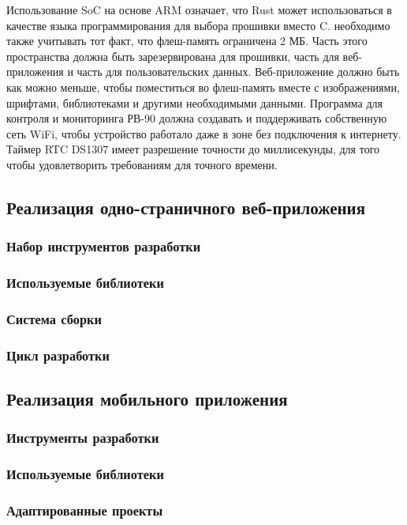 Использование SoC на основе ARM означает, что Rust может использоваться в качестве языка программирования для выбора прошивки вместо C. необходимо также учитывать тот факт, что флеш-память ограничена 2 МБ. Часть этого пространства должна быть зарезервирована для прошивки, часть для веб-приложения и часть для пользовательских данных. Веб-приложение должно быть как можно меньше, чтобы поместиться во флеш-память вместе с изображениями, шрифтами, библиотеками и другими необходимыми данными. Программа для контроля и мониторинга РВ-90 должна создавать и поддерживать собственную сеть WiFi, чтобы устройство работало даже в зоне без подключения к интернету. Таймер RTC DS1307 имеет разрешение точности до миллисекунды, для того чтобы удовлетворить требованиям для точного времени.


\subsection{Реализация одно-страничного веб-приложения}
\subsubsection{Набор инструментов разработки}
\subsubsection{Используемые библиотеки}
\subsubsection{Система сборки}
\subsubsection{Цикл разработки}



\subsection{Реализация мобильного приложения}
\subsubsection{Инструменты разработки}
\subsubsection{Используемые библиотеки}
\subsubsection{Адаптированные проекты}